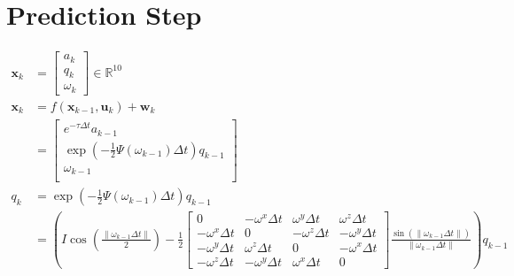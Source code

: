 \documentclass[11pt]{article}
\newcommand{\pd}[2]{\frac{\partial #1}{\partial #2}} %
\begin{document}
\section{Prediction Step}
\begin{align*}
    \mathbf{x}_k &= \begin{bmatrix}
        a_k \\ q_k \\ \omega_k %
    \end{bmatrix} \in \mathbb{R}^{10} \\
    \mathbf{x}_k &= f(\mathbf{x}_{k-1}, \mathbf{u}_k) + \mathbf{w}_k \\
    &= \begin{bmatrix}
        e^{-\tau \Delta t} a_{k-1} \\
        \exp\left(-\frac{1}{2} \Psi(\omega_{k-1}) \Delta t\right) q_{k-1} \\
        \omega_{k-1} \\
    \end{bmatrix} \\
    q_k &= \exp\left(-\frac{1}{2} \Psi(\omega_{k-1}) \Delta t\right) q_{k-1} \\
    &= \left(I \cos\left(\frac{\|\omega_{k-1} \Delta t\|}{2}\right) - \frac{1}{2} \begin{bmatrix}
        0 & -\omega^x \Delta t & \omega^y \Delta t & \omega^z \Delta t \\
        -\omega^x \Delta t & 0 & -\omega^z \Delta t & -\omega^y \Delta t \\
        -\omega^y \Delta t & \omega^z \Delta t & 0 & -\omega^x \Delta t \\
        -\omega^z \Delta t & -\omega^y \Delta t & \omega^x \Delta t & 0
    \end{bmatrix} \frac{\sin\left(\|\omega_{k-1} \Delta t\|\right)}{\|\omega_{k-1} \Delta t\|}\right) q_{k-1} \\

\end{align*}
\end{document}
